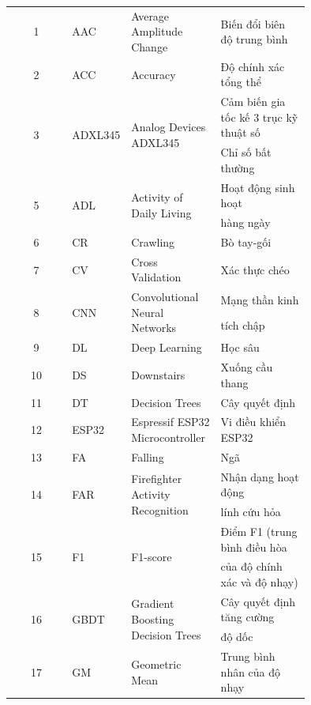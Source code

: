 \begin{longtable}{
        c
        p{0.15\linewidth}
        p{0.30\linewidth}
        p{0.30\linewidth}
    }
    1  & AAC   & Average Amplitude Change        & Biến đổi biên độ trung bình\\
    2  & ACC   & Accuracy                        & Độ chính xác tổng thể\\
    \multirow{2}{*}{3} & \multirow{2}{*}{ADXL345} & \multirow{2}{*}{Analog Devices ADXL345} & Cảm biến gia tốc kế 3 trục kỹ thuật số\\
    4  & AIx   & Abnormality Index               & Chỉ số bất thường\\
    \multirow{2}{*}{5} & \multirow{2}{*}{ADL}   & \multirow{2}{*}{Activity of Daily Living}   & Hoạt động sinh hoạt\\
    \multirow{2}{*}{} & & & hàng ngày\\
    6  & CR    & Crawling                        & Bò tay-gối\\
    7  & CV    & Cross Validation                & Xác thực chéo\\
    \multirow{2}{*}{8} & \multirow{2}{*}{CNN}   & \multirow{2}{*}{Convolutional Neural Networks}  & Mạng thần kinh\\
    \multirow{2}{*}{} & & & tích chập\\
    9  & DL    & Deep Learning                   & Học sâu\\
    10 & DS    & Downstairs                      & Xuống cầu thang\\
    11 & DT    & Decision Trees                  & Cây quyết định\\
    12 & ESP32 & Espressif ESP32 Microcontroller & Vi điều khiển ESP32\\
    13 & FA    & Falling                         & Ngã\\
    \multirow{2}{*}{14} & \multirow{2}{*}{FAR}  & \multirow{2}{*}{Firefighter Activity Recognition} & Nhận dạng hoạt động\\
    \multirow{2}{*}{} & & & lính cứu hỏa\\
    \multirow{2}{*}{15} & \multirow{2}{*}{F1}   & \multirow{2}{*}{F1-score}               & Điểm F1 (trung bình điều hòa\\
    \multirow{2}{*}{} & & & của độ chính xác và độ nhạy)\\
    \multirow{2}{*}{16} & \multirow{2}{*}{GBDT} & \multirow{2}{*}{Gradient Boosting Decision Trees} & Cây quyết định tăng cường\\
    \multirow{2}{*}{} & & & độ dốc\\
    \multirow{2}{*}{17} & \multirow{2}{*}{GM}   & \multirow{2}{*}{Geometric Mean}         & Trung bình nhân của độ nhạy\\

\end{longtable}
